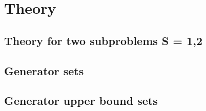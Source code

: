 \section{Theory}

\subsection{Theory for two subproblems S = {1,2}}

\subsection{Generator sets}
	
\subsection{Generator upper bound sets}



